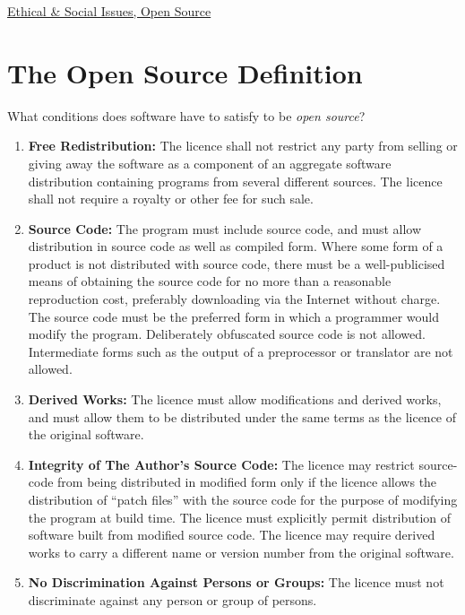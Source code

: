 \documentclass{article}
\begin{document}
\begin{center}
	\underline{\huge Ethical \& Social Issues, Open Source}
\end{center}






\section{The Open Source Definition}
What conditions does software have to satisfy to be \emph{open source}?


\begin{enumerate}
\item {\bf Free Redistribution:}
The licence shall not restrict any party from selling or giving away the software as a component of an aggregate software distribution containing programs from several different sources. The licence shall not require a royalty or other fee for such sale.

\item {\bf Source Code:}
The program must include source code, and must allow distribution in source code as well as compiled form. Where some form of a product is not distributed with source code, there must be a well-publicised means of obtaining the source code for no more than a reasonable reproduction cost, preferably downloading via the Internet without charge. The source code must be the preferred form in which a programmer would modify the program. Deliberately obfuscated source code is not allowed. Intermediate forms such as the output of a preprocessor or translator are not allowed.

\item {\bf Derived Works:}
The licence must allow modifications and derived works, and must allow them to be distributed under the same terms as the licence of the original software.

\item {\bf Integrity of The Author's Source Code:}
The licence may restrict source-code from being distributed in modified form only if the licence allows the distribution of ``patch files'' with the source code for the purpose of modifying the program at build time. The licence must explicitly permit distribution of software built from modified source code. The licence may require derived works to carry a different name or version number from the original software.

\item {\bf No Discrimination Against Persons or Groups:}
The licence must not discriminate against any person or group of persons.


\end{enumerate}
\end{document}
